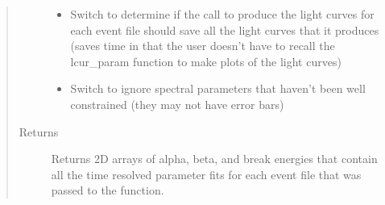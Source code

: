 \documentclass[letterpaper,10pt,english]{sphinxmanual}
\begin{document}
\begin{fulllineitems}
\begin{quote}
\begin{description}
\begin{itemize}
\item {} 
 \textendash{} Switch to determine if the call to produce the light curves for each event file should
save all the light curves that it produces (saves time in that the user doesn’t have to recall the
lcur\_param function to make plots of the light curves)

\item {} 
 \textendash{} Switch to ignore spectral parameters that haven’t been well constrained (they may not have
error bars)

\end{itemize}

\item[{Returns}] \leavevmode
Returns 2D arrays of alpha, beta, and break energies that contain all the time resolved parameter fits for
each event file that was passed to the function.

\end{description}\end{quote}

\end{fulllineitems}

\end{document}
